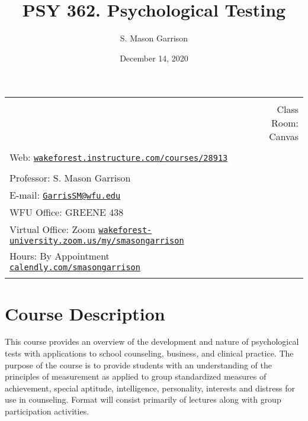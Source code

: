 \documentclass[11pt,]{article}
\title{PSY 362. Psychological Testing}
\author{S. Mason Garrison}
\date{December 14, 2020}
\begin{document}
		\maketitle
	

		\thispagestyle{firststyle}



\noindent \begin{tabular*}{\textwidth}{ @{\extracolsep{\fill}} lr @{\extracolsep{\fill}}}
\hline\\
    &  Class Room: Canvas
%
\\\hline\\
%
 Web: \href{https://wakeforest.instructure.com/courses/28913}{\tt wakeforest.instructure.com/courses/28913}&  \\ %
&  \\
Professor: S. Mason Garrison \\

E-mail: \texttt{\href{mailto:GarrisSM@wfu.edu}{\nolinkurl{GarrisSM@wfu.edu}}}  \\

WFU Office: GREENE 438   \\
Virtual Office: Zoom
\href{https://wakeforest-university.zoom.us/my/smasongarrison}{\tiny\tt wakeforest-university.zoom.us/my/smasongarrison}   \\
Hours: By Appointment
\href{https://calendly.com/smasongarrison/}{\small\tt calendly.com/smasongarrison}  \\


	&  \\
	\hline
\end{tabular*}

\vspace{2mm}

\hypertarget{course-description}{%
\section{Course Description}\label{course-description}}

This course provides an overview of the development and nature of
psychological tests with applications to school counseling, business,
and clinical practice. The purpose of the course is to provide students
with an understanding of the principles of measurement as applied to
group standardized measures of achievement, special aptitude,
intelligence, personality, interests and distress for use in counseling.
Format will consist primarily of lectures along with group participation
activities.
\end{document}
